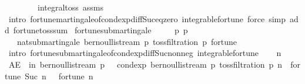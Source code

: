 \begin{isabellebody}
\ \ \ \ \ \ \ \ integral{\isacharunderscore}{\kern0pt}toss\ assms\isanewline
\ \ \ \ \isamarkupfalse%
\ {\isacharparenleft}{\kern0pt}intro\ fortune{\isachardot}{\kern0pt}martingale{\isacharunderscore}{\kern0pt}of{\isacharunderscore}{\kern0pt}cond{\isacharunderscore}{\kern0pt}exp{\isacharunderscore}{\kern0pt}diff{\isacharunderscore}{\kern0pt}Suc{\isacharunderscore}{\kern0pt}eq{\isacharunderscore}{\kern0pt}zero\ integrable{\isacharunderscore}{\kern0pt}fortune{\isacharparenright}{\kern0pt}\ {\isacharparenleft}{\kern0pt}force\ simp\ add{\isacharcolon}{\kern0pt}\ fortune{\isacharunderscore}{\kern0pt}toss{\isacharunderscore}{\kern0pt}sum{\isacharparenright}{\kern0pt}%
\endisatagproof
{\isafoldproof}%
%
\isadelimproof
\isanewline
%
\endisadelimproof
\isanewline
{}\isamarkupfalse%
\ fortune{\isacharunderscore}{\kern0pt}submartingale{\isacharcolon}{\kern0pt}\isanewline
\ \ \ {\isachardoublequoteopen}{}{\isacharslash}{\kern0pt}{}\ {\isasymle}\ p{\isachardoublequoteclose}\ {\isachardoublequoteopen}p\ {\isasymle}\ {}{\isachardoublequoteclose}\isanewline
\ \ \ {\isachardoublequoteopen}nat{\isacharunderscore}{\kern0pt}submartingale\ {\isacharparenleft}{\kern0pt}bernoulli{\isacharunderscore}{\kern0pt}stream\ p{\isacharparenright}{\kern0pt}\ {\isacharparenleft}{\kern0pt}toss{\isacharunderscore}{\kern0pt}filtration\ p{\isacharparenright}{\kern0pt}\ fortune{\isachardoublequoteclose}\isanewline
%
\isadelimproof
%
\endisadelimproof
%
\isatagproof
{}\isamarkupfalse%
\ {\isacharparenleft}{\kern0pt}intro\ fortune{\isachardot}{\kern0pt}submartingale{\isacharunderscore}{\kern0pt}of{\isacharunderscore}{\kern0pt}cond{\isacharunderscore}{\kern0pt}exp{\isacharunderscore}{\kern0pt}diff{\isacharunderscore}{\kern0pt}Suc{\isacharunderscore}{\kern0pt}nonneg\ integrable{\isacharunderscore}{\kern0pt}fortune{\isacharparenright}{\kern0pt}\isanewline
\ \ \isamarkupfalse%
\ n\isanewline
\ \ \isamarkupfalse%
\ {\isachardoublequoteopen}AE\ {\isasymxi}\ in\ bernoulli{\isacharunderscore}{\kern0pt}stream\ p{\isachardot}{\kern0pt}\ {}\ {\isasymle}\ cond{\isacharunderscore}{\kern0pt}exp\ {\isacharparenleft}{\kern0pt}bernoulli{\isacharunderscore}{\kern0pt}stream\ p{\isacharparenright}{\kern0pt}\ {\isacharparenleft}{\kern0pt}toss{\isacharunderscore}{\kern0pt}filtration\ p\ n{\isacharparenright}{\kern0pt}\ {\isacharparenleft}{\kern0pt}{\isasymlambda}{\isasymxi}{\isachardot}{\kern0pt}\ fortune\ {\isacharparenleft}{\kern0pt}Suc\ n{\isacharparenright}{\kern0pt}\ {\isasymxi}\ {\isacharminus}{\kern0pt}\ fortune\ n\ {\isasymxi}{\isacharparenright}{\kern0pt}\ {\isasymxi}{\isachardoublequoteclose}\isanewline

\end{isabellebody}
